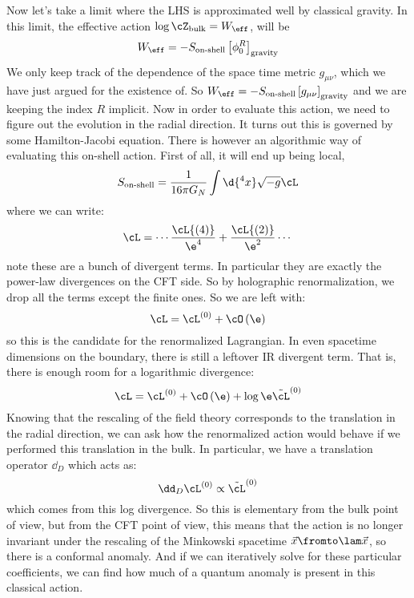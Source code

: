 \documentclass{booc}
\begin{document}
Now let's take a limit where the LHS is approximated well by classical gravity.
In this limit, the effective action $\log \cZ_{\text{bulk}} = W_\eff$, 
will be
\begin{equation}
W_\eff = -S_{\text{on-shell}} \left[ \phi_0^R \right]_{\text{gravity}}
\end{equation}
We only keep track of the dependence of the space time metric $g_{\mu\nu}$,
which we have just argued for the existence of. So 
$W_\eff = -S_{\text{on-shell}} \left[ g_{\mu\nu} \right]_{\text{gravity}}$
and we are keeping the index $R$ implicit.
Now in order to evaluate this action, we need to figure out the evolution in the 
radial direction. 
It turns out this is governed by some Hamilton-Jacobi equation. 
There is however an algorithmic way of evaluating this on-shell action. 
First of all, it will end up being local, 
\begin{equation}
S_{\text{on-shell}}=
\frac{1}{16 \pi G_N} \int \d{^4 x} \sqrt{-g} \cL
\end{equation}
where we can write:
\begin{equation}
\cL = 
\cdots
\frac{\cL{\left( 4 \right)}}{\e^4}+
\frac{\cL{\left( 2 \right)}}{\e^2}
\cdots
\end{equation}
note these are a bunch of divergent terms.
In particular they are exactly the power-law divergences on the CFT side. 
So by holographic renormalization, we drop all the terms except the finite ones. 
So we are left with:
\begin{equation}
\cL = \cL^{\left( 0 \right)} + \cO\left( \e \right)
\end{equation}
so this is the candidate for the renormalized Lagrangian.
In even spacetime dimensions on the boundary, there is still a leftover IR divergent term. 
That is, there is enough room for a logarithmic divergence:
\begin{equation}
\cL = \cL^{\left( 0 \right)} + \cO\left( \e \right)
+ \log \e \tilde \cL^{\left( 0 \right)}
\end{equation}
Knowing that the rescaling of the field theory corresponds to the translation
in the radial direction, 
we can ask how the renormalized action would behave if we performed this
translation in the bulk. In particular, we have a translation operator
$\dd_D$ which acts as:
\begin{equation}
\dd_D \cL^{\left( 0 \right)} \propto \tilde\cL^{\left( 0 \right)}
\end{equation}
which comes from this log divergence.
So this is elementary from the bulk point of view,
but from the CFT point of view, this means that the action is no longer invariant under
the rescaling of the Minkowski spacetime $\vec{x}\fromto \lam \vec{x}$,
so there is a conformal anomaly.
And if we can iteratively solve for these particular coefficients, we can find 
how much of a quantum anomaly is present in this classical action.
\end{document}
